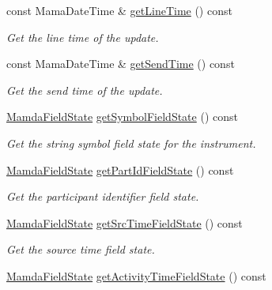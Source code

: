 \begin{CompactItemize}
const Mama\-Date\-Time \& \hyperlink{classWombat_1_1MamdaFundamentalListener_d3e5f97ea0ada9b6db4a8b59e3711da8}{get\-Line\-Time} () const 
\begin{CompactList}\small\item\em Get the line time of the update. \item\end{CompactList}\item 
const Mama\-Date\-Time \& \hyperlink{classWombat_1_1MamdaFundamentalListener_336c86d3f8e9c79c8641e74b146497b3}{get\-Send\-Time} () const 
\begin{CompactList}\small\item\em Get the send time of the update. \item\end{CompactList}\item 
\hyperlink{namespaceWombat_93aac974f2ab713554fd12a1fa3b7d2a}{Mamda\-Field\-State} \hyperlink{classWombat_1_1MamdaFundamentalListener_ed5b159cacedf11c8beb00bf02c78561}{get\-Symbol\-Field\-State} () const 
\begin{CompactList}\small\item\em Get the string symbol field state for the instrument. \item\end{CompactList}\item 
\hyperlink{namespaceWombat_93aac974f2ab713554fd12a1fa3b7d2a}{Mamda\-Field\-State} \hyperlink{classWombat_1_1MamdaFundamentalListener_0262bf50c2afc8dc41440deeb8ba96cd}{get\-Part\-Id\-Field\-State} () const 
\begin{CompactList}\small\item\em Get the participant identifier field state. \item\end{CompactList}\item 
\hyperlink{namespaceWombat_93aac974f2ab713554fd12a1fa3b7d2a}{Mamda\-Field\-State} \hyperlink{classWombat_1_1MamdaFundamentalListener_b375ecf594f9fd285f046d698da763af}{get\-Src\-Time\-Field\-State} () const 
\begin{CompactList}\small\item\em Get the source time field state. \item\end{CompactList}\item 
\hyperlink{namespaceWombat_93aac974f2ab713554fd12a1fa3b7d2a}{Mamda\-Field\-State} \hyperlink{classWombat_1_1MamdaFundamentalListener_d6594a4cff5a7bf08b8f4fcc171d68d9}{get\-Activity\-Time\-Field\-State} () const 

\end{CompactItemize}
